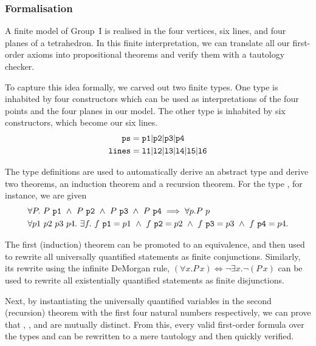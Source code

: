 \subsubsection{Formalisation}
A finite model of Group~I is realised in the four vertices, six lines, and four planes of a tetrahedron. In this finite interpretation, we can translate all our first-order axioms into propositional theorems and verify them with a tautology checker.

To capture this idea formally, we carved out two finite types. One type is inhabited by four constructors which can be used as interpretations of the four points and the four planes in our model. The other type is inhabited by six constructors, which become our six lines.
\begin{align*}
\texttt{ps}   &= \texttt{p1} \vert \texttt{p2} \vert\texttt{p3} \vert\texttt{p4}\\
\texttt{lines}&= \texttt{l1} \vert \texttt{l2} \vert\texttt{l3} \vert\texttt{l4} \vert\texttt{l5} \vert\texttt{l6}\\
\end{align*}

The type definitions are used to automatically derive an abstract type and derive two theorems, an induction theorem and a recursion theorem. For the type , for instance, we are given
\begin{align*}
&\forall P.\ P\ \code{p1}\ \wedge\ P\ \code{p2}\ \wedge\ P\ \code{p3}\ \wedge\ P\ \code{p4}\implies\forall p. P\ p\\
&\forall p1\ p2\ p3\ p4.\ \exists f.\ f\ \code{p1} = p1\ \wedge\ f\ \code{p2} = p2\ \wedge\ f\ \code{p3} = p3\ \wedge\ f\ \code{p4} = p4.
\end{align*}

The first (induction) theorem can be promoted to an equivalence, and then used to rewrite all universally quantified statements as finite conjunctions. Similarly, its rewrite using the infinite DeMorgan rule, $(\forall x. P\,x) \iff \neg\exists x. \neg (P\,x)$ can be used to rewrite all existentially quantified statements as finite disjunctions.

Next, by instantiating the universally quantified variables in the second (recursion) theorem with the first four natural numbers respectively, we can prove that , ,  and  are mutually distinct. From this, every valid first-order formula over the types  and  can be rewritten to a mere tautology and then quickly verified.

